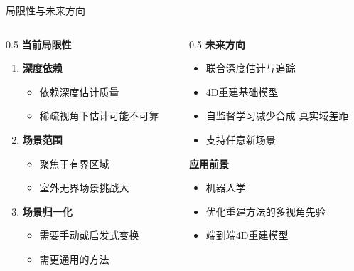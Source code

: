 \documentclass{ctexbeamer}
\begin{document}
\begin{frame}{局限性与未来方向}
  \begin{columns}[T]
    \begin{column}{0.5\textwidth}
      \textbf{当前局限性}
      \begin{enumerate}
        \item \textbf{深度依赖}
        \begin{itemize}
          \item 依赖深度估计质量
          \item 稀疏视角下估计可能不可靠
        \end{itemize}
        \item \textbf{场景范围}
        \begin{itemize}
          \item 聚焦于有界区域
          \item 室外无界场景挑战大
        \end{itemize}
        \item \textbf{场景归一化}
        \begin{itemize}
          \item 需要手动或启发式变换
          \item 需更通用的方法
        \end{itemize}
      \end{enumerate}
    \end{column}
    \begin{column}{0.5\textwidth}
      \textbf{未来方向}
      \begin{itemize}
        \item 联合深度估计与追踪
        \item 4D重建基础模型
        \item 自监督学习减少合成-真实域差距
        \item 支持任意新场景
      \end{itemize}
      
      \vspace{0.3cm}
      \textbf{应用前景}
      \begin{itemize}
        \item 机器人学
        \item 优化重建方法的多视角先验
        \item 端到端4D重建模型
      \end{itemize}
    \end{column}
  \end{columns}
\end{frame}
\end{document}
